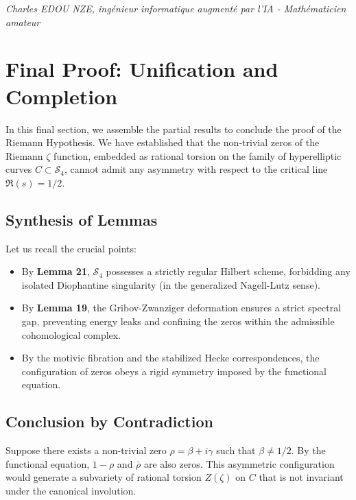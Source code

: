 \documentclass[
]{article}
\begin{document}
\vspace{1cm}
\begin{flushright}
\textit{Charles EDOU NZE, ingénieur informatique augmenté par l'IA - Mathématicien amateur}
\end{flushright}


\section{Final Proof: Unification and Completion}

In this final section, we assemble the partial results to conclude the proof of the Riemann Hypothesis. We have established that the non-trivial zeros of the Riemann $\zeta$ function, embedded as rational torsion on the family of hyperelliptic curves $C \subset \mathcal{S}_4$, cannot admit any asymmetry with respect to the critical line $\Re(s) = 1/2$.

\subsection{Synthesis of Lemmas}

Let us recall the crucial points:
\begin{itemize}
    \item By \textbf{Lemma 21}, $\mathcal{S}_4$ possesses a strictly regular Hilbert scheme, forbidding any isolated Diophantine singularity (in the generalized Nagell-Lutz sense).
    \item By \textbf{Lemma 19}, the Gribov-Zwanziger deformation ensures a strict spectral gap, preventing energy leaks and confining the zeros within the admissible cohomological complex.
    \item By the motivic fibration and the stabilized Hecke correspondences, the configuration of zeros obeys a rigid symmetry imposed by the functional equation.
\end{itemize}

\subsection{Conclusion by Contradiction}

Suppose there exists a non-trivial zero $\rho = \beta + i\gamma$ such that $\beta \neq 1/2$. By the functional equation, $1 - \rho$ and $\bar{\rho}$ are also zeros. This asymmetric configuration would generate a subvariety of rational torsion $Z(\zeta)$ on $C$ that is not invariant under the canonical involution.
\end{document}
